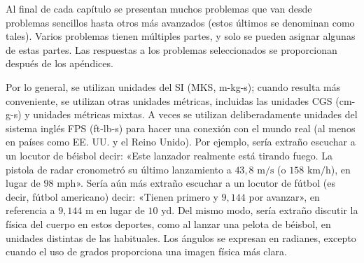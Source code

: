 ﻿\documentclass{book}
\begin{document}
Al final de cada capítulo se presentan muchos problemas que van desde problemas sencillos hasta otros más avanzados (estos últimos se denominan como tales). Varios problemas tienen múltiples partes, y solo se pueden asignar algunas de estas partes. Las respuestas a los problemas seleccionados se proporcionan después de los apéndices.

Por lo general, se utilizan unidades del SI (MKS, m-kg-s); cuando resulta más conveniente, se utilizan otras unidades métricas, incluidas las unidades CGS (cm-g-s) y unidades métricas mixtas. A veces se utilizan deliberadamente unidades del sistema inglés FPS (ft-lb-s) para hacer una conexión con el mundo real (al menos en países como EE. UU. y el Reino Unido). Por ejemplo, sería extraño escuchar a un locutor de béisbol decir: «Este lanzador realmente está tirando fuego. La pistola de radar cronometró su último lanzamiento a $43,8\text{ m/s}$ (o $158\text{ km/h}$), en lugar de $98\text{ mph}$». Sería aún más extraño escuchar a un locutor de fútbol (es decir, fútbol americano) decir: «Tienen primero y $9,144$ por avanzar», en referencia a $9,144\text{ m}$ en lugar de $10\text{ yd}$. Del mismo modo, sería extraño discutir la física del cuerpo en estos deportes, como al lanzar una pelota de béisbol, en unidades distintas de las habituales. Los ángulos se expresan en radianes, excepto cuando el uso de grados proporciona una imagen física más clara.
\end{document}

